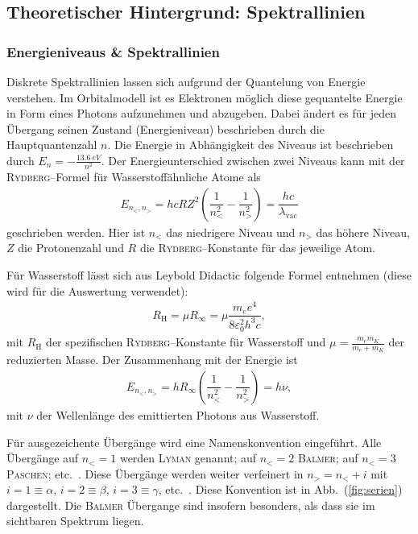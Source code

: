 \documentclass[sn-mathphys-num,iicol]{sn-jnl}
\theoremstyle{thmstyleone}
\theoremstyle{thmstyletwo}
\theoremstyle{thmstylethree}
\begin{document}
\subsection{Theoretischer Hintergrund: Spektrallinien}
\subsubsection{Energieniveaus \& Spektrallinien}
Diskrete Spektrallinien lassen sich aufgrund der Quantelung von Energie verstehen.
Im Orbitalmodell ist es Elektronen möglich diese gequantelte Energie in Form eines Photons aufzunehmen und abzugeben.
Dabei ändert es für jeden Übergang seinen Zustand (Energieniveau) beschrieben durch die Hauptquantenzahl $n$.
Die Energie in Abhängigkeit des Niveaus ist beschrieben durch $E_n=-\tfrac{\SI{13.6}{eV}}{n^2}$.
Der Energieunterschied zwischen zwei Niveaus kann mit der \textsc{Rydberg}--Formel für Wasserstoffähnliche Atome als 
\begin{align} 
        E_{n_<,n_>}=hcRZ^2\left(\dfrac{1}{n_<^2}-\dfrac{1}{n_>^2}\right)=\dfrac{hc}{\lambda _\text{vac}}
\end{align} 
geschrieben werden.
Hier ist $n_<$ das niedrigere Niveau und $n_>$ das höhere Niveau, $Z$ die Protonenzahl und $R$ die \textsc{Rydberg}--Konstante für das jeweilige Atom.

Für Wasserstoff lässt sich aus Leybold Didactic \cite{LeyboldBalmerserieBeobachtung} folgende Formel entnehmen (diese wird für die Auswertung verwendet):
\begin{align} 
        R_\text{H}=\mu R_{\infty}=\mu \dfrac{m_e e^4}{8\varepsilon _0^2h^3c}
,\end{align} 
mit $R_\text{H}$ der spezifischen \textsc{Rydberg}--Konstante für Wasserstoff und $\mu =\tfrac{m_em_K}{m_e+m_K}$ der reduzierten Masse.
Der Zusammenhang mit der Energie ist
\begin{align} 
        E_{n_<,n_>}=hR_\infty\left(\dfrac{1}{n_<^2}-\dfrac{1}{n_>^2}\right)=h\nu 
,\end{align} 
mit $\nu $ der Wellenlänge des emittierten Photons aus Wasserstoff.

Für ausgezeichente Übergänge wird eine Namenskonvention eingeführt.
Alle Übergänge auf $n_<=1$ werden \textsc{Lyman} genannt; auf $n_<=2$ \textsc{Balmer}; auf $n_<=3$ \textsc{Paschen}; etc.\ .
Diese Übergänge werden weiter verfeinert in $n_>=n_<+i$ mit $i=1\equiv \alpha $, $i=2\equiv \beta $, $i=3\equiv \gamma $, etc.\ .
Diese Konvention ist in Abb.\ (\ref{fig:serien}) dargestellt.
Die \textsc{Balmer} Übergange sind insofern besonders, als dass sie im sichtbaren Spektrum liegen.
\end{document}
